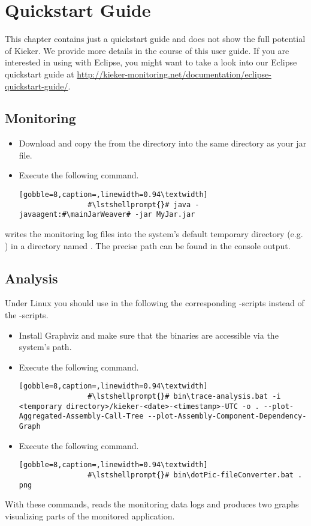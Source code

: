 \chapter{Quickstart Guide}\label{chp:Quickstart-Guide}

	This chapter contains just a quickstart guide and does not show the full potential of Kieker. We provide more details in the course of this user guide. If you are interested in using \Kieker{} with Eclipse, you might want to take a look into our Eclipse quickstart guide at \url{http://kieker-monitoring.net/documentation/eclipse-quickstart-guide/}.

	\section{Monitoring}

		\begin{itemize}
			\item Download \Kieker{} and copy the \mainJarWeaver{} from the  directory into the same directory as your jar file.
			\item Execute the following command.
			\setBashListing
			\begin{lstlisting}[gobble=8,caption=,linewidth=0.94\textwidth]
				#\lstshellprompt{}# java -javaagent:#\mainJarWeaver# -jar MyJar.jar
			\end{lstlisting} 
		\end{itemize}
	
		\noindent
		\Kieker{} writes the monitoring log files into the system’s default temporary directory (e.g. ) in a directory named . The precise path can be found in the console output.

	\section{Analysis}
	
		Under Linux you should use in the following the corresponding -scripts instead of the -scripts.
	

		\begin{itemize}
			\item Install Graphviz and make sure that the binaries are accessible via the system’s path.
			\item Execute the following command.
			\setBashListing
			\begin{lstlisting}[gobble=8,caption=,linewidth=0.94\textwidth]
				#\lstshellprompt{}# bin\trace-analysis.bat -i <temporary directory>/kieker-<date>-<timestamp>-UTC -o . --plot-Aggregated-Assembly-Call-Tree --plot-Assembly-Component-Dependency-Graph
			\end{lstlisting} 
			\item Execute the following command.
			\setBashListing
			\begin{lstlisting}[gobble=8,caption=,linewidth=0.94\textwidth]
				#\lstshellprompt{}# bin\dotPic-fileConverter.bat . png
			\end{lstlisting} 
		\end{itemize}	
		
		\noindent
		With these commands, \Kieker{} reads the monitoring data logs and produces two graphs visualizing parts of the monitored application. 
		